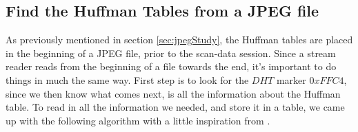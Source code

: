 \subsection{Find the Huffman Tables from a JPEG file}
\label{sec:DesignHuffman}
As previously mentioned in section \ref{sec:jpegStudy}, the Huffman tables are placed in the beginning of a JPEG file, prior to the scan-data session. 
Since a stream reader reads from the beginning of a file towards the end, it's important to do things in much the same way. 
First step is to look for the $DHT$ marker $0xFFC4$, since we then know what comes next, is all the information about the Huffman table. 
To read in all the information we needed, and store it in a table, we came up with the following algorithm with a little inspiration from \cite{HuffmanDecoding}.

